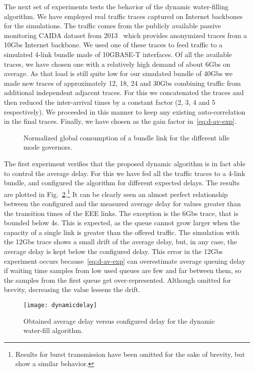 \documentclass[journal,english,twocolumn,10pt,letterpaper]{IEEEtran}
\newcommand{\added}[1]{{#1}}
\begin{document}
The next set of experiments tests the behavior of the dynamic water-filling
algorithm. We have employed real traffic traces captured on Internet backbones
for the simulations. The traffic comes from the publicly available passive
monitoring CAIDA dataset from
2013~\cite{internet13:_caida_ucsd_anony_inter_traces} which provides
anonymized traces from a 10Gbs Internet backbone. We used one of these
traces to feed traffic to a simulated 4-link bundle made of 10GBASE-T
interfaces. Of all the available traces, we have chosen one with a relatively
high demand of about 6Gbs on average. As that load is \added{still}
quite low for our simulated bundle of 40Gbs we made new traces of
approximately 12, 18, 24 and 30Gbs combining traffic from additional
independent adjacent traces\added{. For this we concatenated the traces and
  then reduced the inter-arrival times by a constant factor (2, 3, 4 and 5
  respectively). We proceeded in this manner to keep any existing
  auto-correlation in the final traces.} \added{Finally, we have chosen
   as the gain factor in~\eqref{eq:d-av-exp}.}
\begin{figure}
  \centering
  \caption{\label{fig:limits-exp} Normalized global consumption of a bundle
    link for the different idle mode governors.}
\end{figure}


The first experiment verifies that the \added{proposed dynamic }algorithm is
in fact able to control the average delay. For this we have fed all the
traffic traces to a 4-link bundle, and configured the algorithm for different
expected delays. The results are plotted in
\added{Fig.}~\ref{fig:delayvsdelay}.\footnote{Results for burst transmission
  have been omitted for the sake of brevity, but show a similar behavior.} It
can be clearly seen an almost perfect relationship between the configured and
the measured average delay for values greater than the transition times of the
EEE links. The exception is the 6Gbs trace, that is bounded below
4s. This is expected, as the queue cannot grow larger when the capacity
of a single link is greater than the offered traffic. The simulation with the
12Gbs trace shows a small drift of the average delay, but, in any case,
the average delay is kept below the configured delay. \added{This error in the
  12Gbs experiment occurs because~\eqref{eq:d-av-exp} can overestimate
  average queuing delay if waiting time samples from low used queues are few
  and far between them, so the samples from the first queue get
  over-represented. Although omitted for brevity, decreasing the  value
  lessens the drift.}
\begin{figure}
  \centering
  \texttt{[image: dynamicdelay]}
  \caption{Obtained average delay versus configured delay for the dynamic water-fill algorithm.}
  \label{fig:delayvsdelay}
\end{figure}
\end{document}
